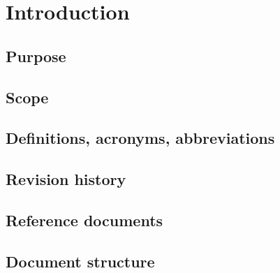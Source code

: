 \section{Introduction}

\subsection{Purpose}
\subsection{Scope}
\subsection{Definitions, acronyms, abbreviations}
\subsection{Revision history}
\subsection{Reference documents}
\subsection{Document structure}